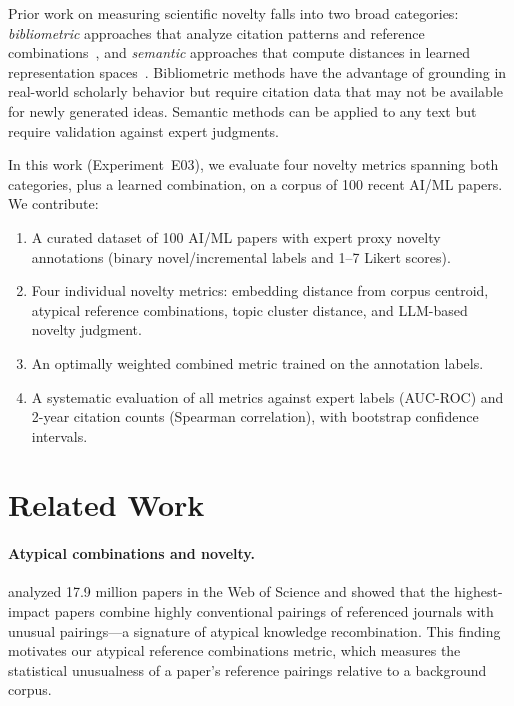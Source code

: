 \documentclass[11pt,a4paper]{article}
\begin{document}
Prior work on measuring scientific novelty falls into two broad
categories: \emph{bibliometric} approaches that analyze citation
patterns and reference combinations~\citep{uzzi2013atypical,
arts2020natural}, and \emph{semantic} approaches that compute distances
in learned representation spaces~\citep{beaty2021automating,
grootendorst2022bertopic}.  Bibliometric methods have the advantage of
grounding in real-world scholarly behavior but require citation data that
may not be available for newly generated ideas.  Semantic methods can be
applied to any text but require validation against expert judgments.

In this work (Experiment~E03), we evaluate four novelty metrics spanning
both categories, plus a learned combination, on a corpus of 100 recent
AI/ML papers.  We contribute:

\begin{enumerate}
  \item A curated dataset of 100 AI/ML papers with expert proxy novelty
        annotations (binary novel/incremental labels and 1--7 Likert
        scores).
  \item Four individual novelty metrics: embedding distance from corpus
        centroid, atypical reference combinations, topic cluster distance,
        and LLM-based novelty judgment.
  \item An optimally weighted combined metric trained on the annotation
        labels.
  \item A systematic evaluation of all metrics against expert labels
        (AUC-ROC) and 2-year citation counts (Spearman correlation),
        with bootstrap confidence intervals.
\end{enumerate}

\section{Related Work}
\label{sec:related}

\paragraph{Atypical combinations and novelty.}
\citet{uzzi2013atypical} analyzed 17.9 million papers in the Web of
Science and showed that the highest-impact papers combine highly
conventional pairings of referenced journals with unusual pairings---a
signature of atypical knowledge recombination.  This finding motivates
our atypical reference combinations metric, which measures the
statistical unusualness of a paper's reference pairings relative to a
background corpus.
\end{document}
